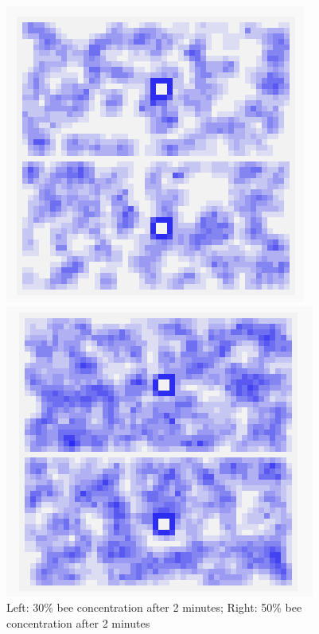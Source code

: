 \documentclass[conference,compsoc,onecolumn]{IEEEtran}
\begin{document}
\begin{figure}[!tbp]
	\centering
	\begin{minipage}[b]{0.4\textwidth}
		\includegraphics[width=\textwidth]{../images/hive-30per-02-00-00.PNG}
	\end{minipage}
	\hfill
	\begin{minipage}[b]{0.4\textwidth}
		\includegraphics[width=\textwidth]{../images/hive-50per-02-00-00.PNG}
	\end{minipage}
	\caption{Left: 30\% bee concentration after 2 minutes; Right: 50\% bee concentration after 2 minutes}
	\label{casu-30-50}
\end{figure}
\end{document}
